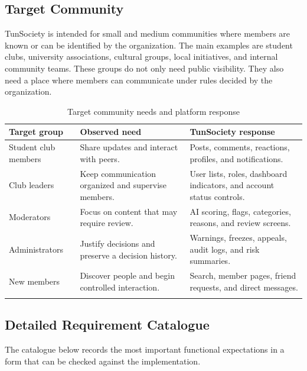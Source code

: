 \subsection*{Target Community}

TunSociety is intended for small and medium communities where members are known or can be identified by the organization. The main examples are student clubs, university associations, cultural groups, local initiatives, and internal community teams. These groups do not only need public visibility. They also need a place where members can communicate under rules decided by the organization.

\begin{longtable}{|m{3.2cm}|m{5.2cm}|m{5.5cm}|}
\hline
\textbf{Target group} & \textbf{Observed need} & \textbf{TunSociety response} \\
\hline
Student club members & Share updates and interact with peers. & Posts, comments, reactions, profiles, and notifications. \\
\hline
Club leaders & Keep communication organized and supervise members. & User lists, roles, dashboard indicators, and account status controls. \\
\hline
Moderators & Focus on content that may require review. & AI scoring, flags, categories, reasons, and review screens. \\
\hline
Administrators & Justify decisions and preserve a decision history. & Warnings, freezes, appeals, audit logs, and risk summaries. \\
\hline
New members & Discover people and begin controlled interaction. & Search, member pages, friend requests, and direct messages. \\
\hline
\caption{Target community needs and platform response}
\end{longtable}

\subsection*{Detailed Requirement Catalogue}

The catalogue below records the most important functional expectations in a form that can be checked against the implementation.

